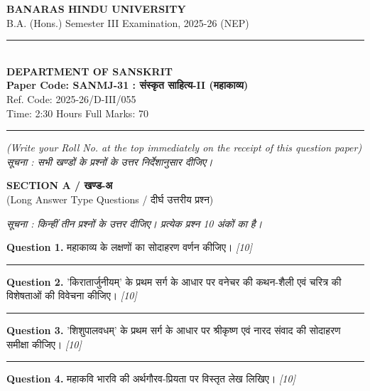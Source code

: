\documentclass[11pt,a4paper]{article}
\newcommand{\pts}[1]{\hfill \textit{[#1]}}
\begin{document}
\begin{center}
  {\large\bfseries BANARAS HINDU UNIVERSITY}\\[2pt]
  {\normalsize B.A. (Hons.) Semester III Examination, 2025-26 (NEP)}\\[6pt]
  \rule{0.8\linewidth}{0.5pt}\\[6pt]
  {\large\bfseries DEPARTMENT OF SANSKRIT}\\[4pt]
  {\large\bfseries Paper Code: SANMJ-31 : संस्कृत साहित्य-II (महाकाव्य)}\\[2pt]
  {\small Ref. Code: 2025-26/D-III/055}\\[4pt]
  {\normalsize Time: 2:30 Hours \hfill Full Marks: 70}
\end{center}

\rule{\linewidth}{0.4pt}

\smallskip

\noindent \textit{(Write your Roll No. at the top immediately on the receipt of this question paper)}\\[2pt]
\noindent \textit{सूचना : सभी खण्डों के प्रश्नों के उत्तर निर्देशानुसार दीजिए।}

\bigskip

\begin{center}
  {\large\bfseries SECTION A / खण्ड-अ}\\[2pt]
  {\normalsize (Long Answer Type Questions / दीर्घ उत्तरीय प्रश्न)}
\end{center}

\noindent \textit{सूचना : किन्हीं तीन प्रश्नों के उत्तर दीजिए। प्रत्येक प्रश्न 10 अंकों का है।}\\[2pt]

\bigskip

\noindent \textbf{Question 1.} महाकाव्य के लक्षणों का सोदाहरण वर्णन कीजिए। \pts{10}

\medskip\rule{\linewidth}{0.2pt}\medskip

\noindent \textbf{Question 2.} 'किरातार्जुनीयम्' के प्रथम सर्ग के आधार पर वनेचर की कथन-शैली एवं चरित्र की विशेषताओं की विवेचना कीजिए। \pts{10}

\medskip\rule{\linewidth}{0.2pt}\medskip

\noindent \textbf{Question 3.} 'शिशुपालवधम्' के प्रथम सर्ग के आधार पर श्रीकृष्ण एवं नारद संवाद की सोदाहरण समीक्षा कीजिए। \pts{10}

\medskip\rule{\linewidth}{0.2pt}\medskip

\noindent \textbf{Question 4.} महाकवि भारवि की अर्थगौरव-प्रियता पर विस्तृत लेख लिखिए। \pts{10}
\end{document}
